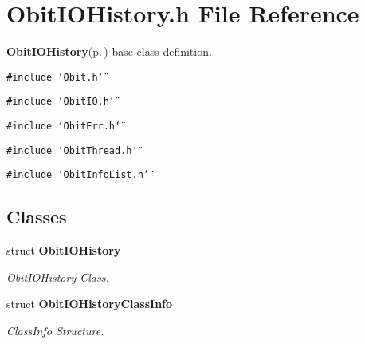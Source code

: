\section{Obit\-IOHistory.h File Reference}
\label{ObitIOHistory_8h}
{\bf Obit\-IOHistory}{\rm (p.\,\pageref{structObitIOHistory})} base class definition. 

{\tt \#include \char`\"{}Obit.h\char`\"{}}\par
{\tt \#include \char`\"{}Obit\-IO.h\char`\"{}}\par
{\tt \#include \char`\"{}Obit\-Err.h\char`\"{}}\par
{\tt \#include \char`\"{}Obit\-Thread.h\char`\"{}}\par
{\tt \#include \char`\"{}Obit\-Info\-List.h\char`\"{}}\par
\subsection*{Classes}
\begin{CompactItemize}
\item 
struct {\bf Obit\-IOHistory}
\begin{CompactList}\small\item\em Obit\-IOHistory Class. \item\end{CompactList}\item 
struct {\bf Obit\-IOHistory\-Class\-Info}
\begin{CompactList}\small\item\em Class\-Info Structure. \item\end{CompactList}\end{CompactItemize}
